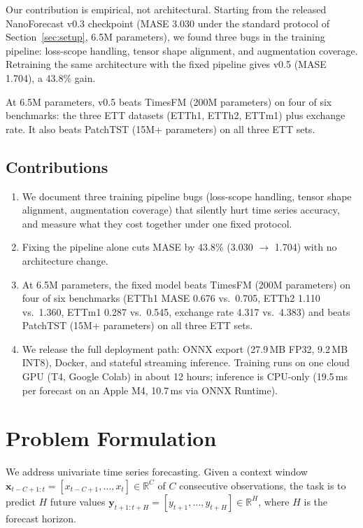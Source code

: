 \documentclass[11pt]{article}
\begin{document}
Our contribution is empirical, not architectural. Starting from the released NanoForecast v0.3 checkpoint (MASE 3.030 under the standard protocol of Section~\ref{sec:setup}, 6.5M parameters), we found three bugs in the training pipeline: loss-scope handling, tensor shape alignment, and augmentation coverage. Retraining the same architecture with the fixed pipeline gives v0.5 (MASE 1.704), a 43.8\% gain.

At 6.5M parameters, v0.5 beats TimesFM (200M parameters) on four of six benchmarks: the three ETT datasets (ETTh1, ETTh2, ETTm1) plus exchange rate. It also beats PatchTST (15M+ parameters) on all three ETT sets.

\subsection{Contributions}
\label{sec:contributions}

\begin{enumerate}
\item We document three training pipeline bugs (loss-scope handling, tensor shape alignment, augmentation coverage) that silently hurt time series accuracy, and measure what they cost together under one fixed protocol.
\item Fixing the pipeline alone cuts MASE by 43.8\% (3.030 $\to$ 1.704) with no architecture change.
\item At 6.5M parameters, the fixed model beats TimesFM (200M parameters) on four of six benchmarks (ETTh1 MASE 0.676 vs.\ 0.705, ETTh2 1.110 vs.\ 1.360, ETTm1 0.287 vs.\ 0.545, exchange rate 4.317 vs.\ 4.383) and beats PatchTST (15M+ parameters) on all three ETT sets.
\item We release the full deployment path: ONNX export (27.9\,MB FP32, 9.2\,MB INT8), Docker, and stateful streaming inference. Training runs on one cloud GPU (T4, Google Colab) in about 12 hours; inference is CPU-only (19.5\,ms per forecast on an Apple M4, 10.7\,ms via ONNX Runtime).
\end{enumerate}

\section{Problem Formulation}
\label{sec:problem}

We address univariate time series forecasting. Given a context window $\mathbf{x}_{t-C+1:t} = [x_{t-C+1}, \ldots, x_t] \in \mathbb{R}^C$ of $C$ consecutive observations, the task is to predict $H$ future values $\mathbf{y}_{t+1:t+H} = [y_{t+1}, \ldots, y_{t+H}] \in \mathbb{R}^H$, where $H$ is the forecast horizon.
\end{document}
